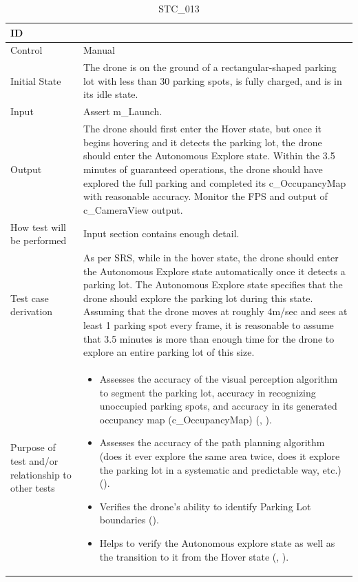 \documentclass[12pt, titlepage]{article}
\begin{document}
\begin{table}[!h]
\begin{center}
\caption {STC\_013}
\label{tab:STC_013}
\begin{tabular}{ | m{3.2cm} | m{12.2cm} | } 
\hline
ID & \nameref{tab:STC_013} \\ 
\hline
Control & Manual \\ 
\hline
Initial State & The drone is on the ground of a rectangular-shaped parking lot with less than 30 parking spots, is fully charged, and is in its idle state.  \\ 
\hline
Input & Assert m\_Launch. \\ 
\hline
Output & The drone should first enter the Hover state, but once it begins hovering and it detects the parking lot, the drone should enter the Autonomous Explore state. Within the 3.5 minutes of guaranteed operations, the drone should have explored the full parking and completed its c\_OccupancyMap with reasonable accuracy. 
Monitor the FPS and output of c\_CameraView output. \\ 
\hline
How test will be performed & Input section contains enough detail. \\ 
\hline
Test case derivation & As per SRS, while in the hover state, the drone should enter the Autonomous Explore state automatically once it detects a parking lot. The Autonomous Explore state specifies that the drone should explore the parking lot during this state. Assuming that the drone moves at roughly 4m/sec and sees at least 1 parking spot every frame, it is reasonable to assume that 3.5 minutes is more than enough time for the drone to explore an entire parking lot of this size.
 \\ 
\hline
Purpose of test and/or relationship to other tests & 
\begin{itemize}
    \item Assesses the accuracy of the visual perception algorithm to segment the parking lot, accuracy in recognizing unoccupied parking spots, and accuracy in its generated occupancy map (c\_OccupancyMap) (\nameref{GEN_005}, \nameref{GEN_006}).
    \item Assesses the accuracy of the path planning algorithm (does it ever explore the same area twice, does it explore the parking lot in a systematic and predictable way, etc.) (\nameref{STA_003}).
    \item Verifies the drone’s ability to identify Parking Lot boundaries (\nameref{GEN_001}).
    \item Helps to verify the Autonomous explore state as well as the transition to it from the Hover state (\nameref{STA_003}, \nameref{TRANS_004}).

\end{itemize}
\end{tabular}
\end{center}
\end{table}
\end{document}
